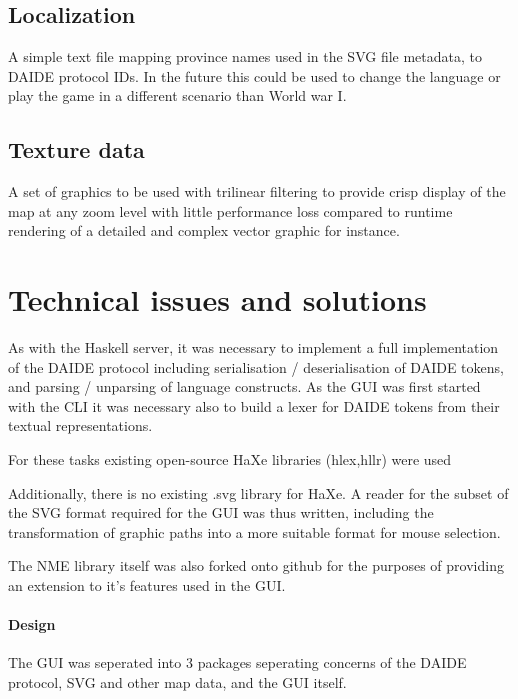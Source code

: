 \subsection{Localization}

A simple text file mapping province names used in the SVG file
metadata, to DAIDE protocol IDs. In the future this could be used to
change the language or play the game in a different scenario than
World war I.

\subsection{Texture data}

A set of graphics to be used with trilinear filtering to provide
crisp display of the map at any zoom level with little
performance loss compared to runtime rendering of a detailed and
complex vector graphic for instance.

\section{Technical issues and solutions}
As with the Haskell server, it was necessary to implement a full
implementation of the DAIDE protocol including serialisation / 
deserialisation of DAIDE tokens, and parsing / unparsing
of language constructs. As the GUI was first started with the CLI it
was necessary also to build a lexer for DAIDE tokens from their
textual representations.

For these tasks existing open-source HaXe libraries (hlex,hllr) were
used \cite{Deltodesco10}

Additionally, there is no existing .svg library for HaXe. A reader for
the subset of the SVG format required for the GUI was thus written,
including the transformation of graphic paths into a more suitable
format for mouse selection.

The NME library itself was also forked onto github for the purposes of
providing an extension to it's features used in the GUI.

\paragraph{Design}
The GUI was seperated into 3 packages seperating concerns of the DAIDE
protocol, SVG and other map data, and the GUI itself.\\[0.5cm]

